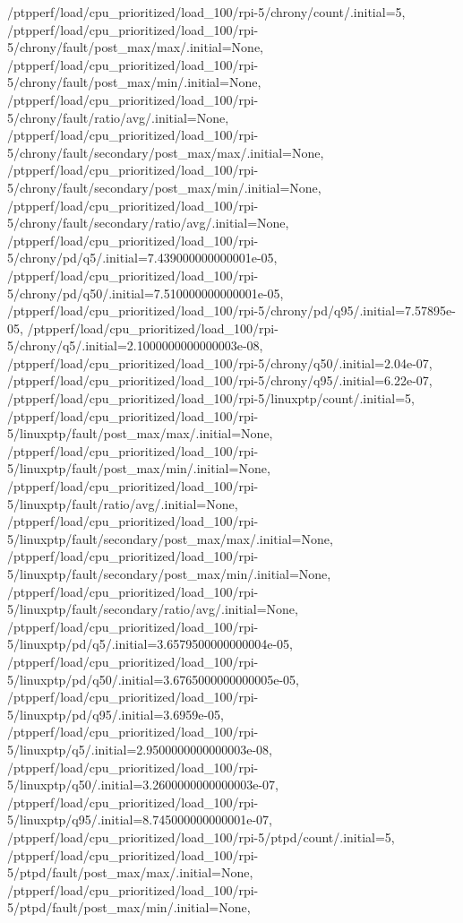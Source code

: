 {    /ptpperf/load/cpu_prioritized/load_100/rpi-5/chrony/count/.initial=5,
    /ptpperf/load/cpu_prioritized/load_100/rpi-5/chrony/fault/post_max/max/.initial=None,
    /ptpperf/load/cpu_prioritized/load_100/rpi-5/chrony/fault/post_max/min/.initial=None,
    /ptpperf/load/cpu_prioritized/load_100/rpi-5/chrony/fault/ratio/avg/.initial=None,
    /ptpperf/load/cpu_prioritized/load_100/rpi-5/chrony/fault/secondary/post_max/max/.initial=None,
    /ptpperf/load/cpu_prioritized/load_100/rpi-5/chrony/fault/secondary/post_max/min/.initial=None,
    /ptpperf/load/cpu_prioritized/load_100/rpi-5/chrony/fault/secondary/ratio/avg/.initial=None,
    /ptpperf/load/cpu_prioritized/load_100/rpi-5/chrony/pd/q5/.initial=7.439000000000001e-05,
    /ptpperf/load/cpu_prioritized/load_100/rpi-5/chrony/pd/q50/.initial=7.510000000000001e-05,
    /ptpperf/load/cpu_prioritized/load_100/rpi-5/chrony/pd/q95/.initial=7.57895e-05,
    /ptpperf/load/cpu_prioritized/load_100/rpi-5/chrony/q5/.initial=2.1000000000000003e-08,
    /ptpperf/load/cpu_prioritized/load_100/rpi-5/chrony/q50/.initial=2.04e-07,
    /ptpperf/load/cpu_prioritized/load_100/rpi-5/chrony/q95/.initial=6.22e-07,
    /ptpperf/load/cpu_prioritized/load_100/rpi-5/linuxptp/count/.initial=5,
    /ptpperf/load/cpu_prioritized/load_100/rpi-5/linuxptp/fault/post_max/max/.initial=None,
    /ptpperf/load/cpu_prioritized/load_100/rpi-5/linuxptp/fault/post_max/min/.initial=None,
    /ptpperf/load/cpu_prioritized/load_100/rpi-5/linuxptp/fault/ratio/avg/.initial=None,
    /ptpperf/load/cpu_prioritized/load_100/rpi-5/linuxptp/fault/secondary/post_max/max/.initial=None,
    /ptpperf/load/cpu_prioritized/load_100/rpi-5/linuxptp/fault/secondary/post_max/min/.initial=None,
    /ptpperf/load/cpu_prioritized/load_100/rpi-5/linuxptp/fault/secondary/ratio/avg/.initial=None,
    /ptpperf/load/cpu_prioritized/load_100/rpi-5/linuxptp/pd/q5/.initial=3.6579500000000004e-05,
    /ptpperf/load/cpu_prioritized/load_100/rpi-5/linuxptp/pd/q50/.initial=3.6765000000000005e-05,
    /ptpperf/load/cpu_prioritized/load_100/rpi-5/linuxptp/pd/q95/.initial=3.6959e-05,
    /ptpperf/load/cpu_prioritized/load_100/rpi-5/linuxptp/q5/.initial=2.9500000000000003e-08,
    /ptpperf/load/cpu_prioritized/load_100/rpi-5/linuxptp/q50/.initial=3.2600000000000003e-07,
    /ptpperf/load/cpu_prioritized/load_100/rpi-5/linuxptp/q95/.initial=8.745000000000001e-07,
    /ptpperf/load/cpu_prioritized/load_100/rpi-5/ptpd/count/.initial=5,
    /ptpperf/load/cpu_prioritized/load_100/rpi-5/ptpd/fault/post_max/max/.initial=None,
    /ptpperf/load/cpu_prioritized/load_100/rpi-5/ptpd/fault/post_max/min/.initial=None,
}

